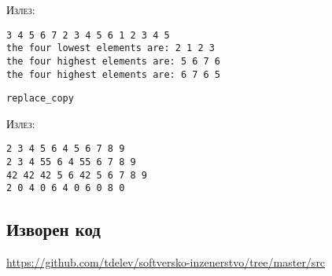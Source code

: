\textsc{Излез:}
\begin{verbatim}
3 4 5 6 7 2 3 4 5 6 1 2 3 4 5 
the four lowest elements are: 2 1 2 3 
the four highest elements are: 5 6 7 6 
the four highest elements are: 6 7 6 5
\end{verbatim}


\texttt{replace\_copy}


\textsc{Излез:}
\begin{verbatim}
2 3 4 5 6 4 5 6 7 8 9 
2 3 4 55 6 4 55 6 7 8 9 
42 42 42 5 6 42 5 6 7 8 9 
2 0 4 0 6 4 0 6 0 8 0
\end{verbatim}


\subsection{Изворен код}
\href{https://github.com/tdelev/softversko-inzenerstvo/tree/master/src}{https://github.com/tdelev/softversko-inzenerstvo/tree/master/src}



